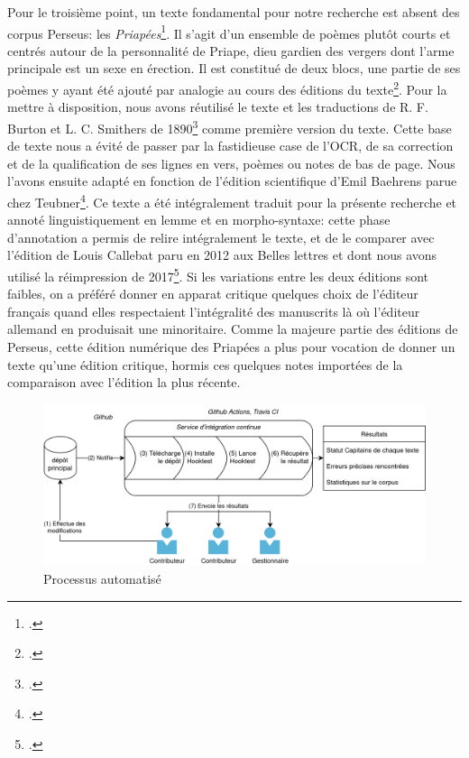 Pour le troisième point, un texte fondamental pour notre recherche est absent des corpus Perseus: les \textit{Priapées}\footcite{Clerice_Digital_edition_of_2020}. Il s'agit d'un ensemble de poèmes plutôt courts et centrés autour de la personnalité de Priape, dieu gardien des vergers dont l'arme principale est un sexe en érection. Il est constitué de deux blocs, une partie de ses poèmes y ayant été ajouté par analogie au cours des éditions du texte\footcite{callebat_les_2008}. Pour la mettre à disposition, nous avons réutilisé le texte et les traductions de R. F. Burton et L. C. Smithers de 1890\footcite{burton_priapeia_1890} comme première version du texte. Cette base de texte nous a évité de passer par la fastidieuse case de l'OCR, de sa correction et de la qualification de ses lignes en vers, poèmes ou notes de bas de page. Nous l'avons ensuite adapté en fonction de l'édition scientifique d'Emil Baehrens parue chez Teubner\footcite{baehrens_poetae_1910}. Ce texte a été intégralement traduit pour la présente recherche et annoté linguistiquement en lemme et en morpho-syntaxe: cette phase d'annotation a permis de relire intégralement le texte, et de le comparer avec l'édition de Louis Callebat paru en 2012 aux Belles lettres et dont nous avons utilisé la réimpression de 2017\footcite{callebat_priapees_2012}. Si les variations entre les deux éditions sont faibles, on a préféré donner en apparat critique quelques choix de l'éditeur français quand elles respectaient l'intégralité des manuscrits là où l'éditeur allemand en produisait une minoritaire. Comme la majeure partie des éditions de Perseus, cette édition numérique des Priapées a plus pour vocation de donner un texte qu'une édition critique, hormis ces quelques notes importées de la comparaison avec l'édition la plus récente.

\begin{figure}
    \centering
    \includegraphics[width=\linewidth]{figures/chap1/part2/hooktest.png}
    \caption{Processus automatisé}
    \label{fig:chap1:ci}
\end{figure}

